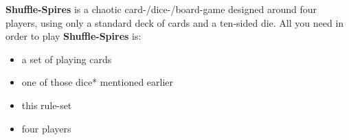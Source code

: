 
\noindent
\textbf{Shuffle-Spires} is a chaotic card-/dice-/board-game designed around four players, using only a standard deck of cards and a ten-sided die.
All you need in order to play \textbf{Shuffle-Spires} is:
\begin{itemize}[noitemsep]
\renewcommand{\labelitemi}{$\bullet$}
	\item a set of playing cards
	\item one of those dice* mentioned earlier
	\item this rule-set
	\item four players
\end{itemize}
